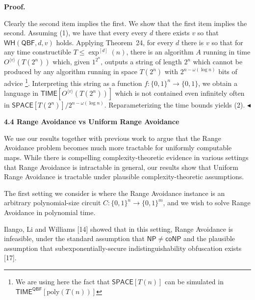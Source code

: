 


\par\medskip\noindent\textbf{Proof.}\par




Clearly the second item implies the first. We show that the first item implies the second. Assuming (1), we have that every every $d$ there exists $v$ so that $\mathsf{WH}(\mathsf{QBF},d,v)$ holds. Applying Theorem 24, for every $d$ there is $v$ so that for any time constructible $T\leq\exp^{[d]}(n)$, there is an algorithm $A$ running in time $O^{\langle v\rangle}(T(2^{n}))$ which, given $1^{2^{n}}$, outputs a string of length $2^{n}$ which cannot be produced by any algorithm running in space $T(2^{n})$ with $2^{n-\omega(\log n)}$ bits of advice \footnote{We are using here the fact that ${\mathsf{SPACE}}[T(n)]$ can be simulated in ${\mathsf{TIME}}^{\mathsf{QBF}}[\mathrm{poly}(T(n))]$}. Interpreting this string as a function $f:\{0,1\}^{n}\to\{0,1\}$, we obtain a language in ${\mathsf{TIME}}[O^{\langle v\rangle}(T(2^{n}))]$ which is not contained even infinitely often in ${\mathsf{SPACE}}[T(2^{n})]/2^{n-\omega(\log n)}$. Reparameterizing the time bounds yields (2).
$\blacktriangleleft$\par






\par\medskip\noindent\textbf{
4.4 Range Avoidance vs Uniform Range Avoidance}\par




We use our results together with previous work to argue that the Range Avoidance problem becomes much more tractable for uniformly computable maps. While there is compelling complexity-theoretic evidence in various settings that Range Avoidance is intractable in general, our results show that Uniform Range Avoidance is tractable under plausible complexity-theoretic assumptions.\par




The first setting we consider is where the Range Avoidance instance is an arbitrary polynomial-size circuit $C:\{0,1\}^{n}\to\{0,1\}^{m}$, and we wish to solve Range Avoidance in polynomial time.\par




Ilango, Li and Williams [14] showed that in this setting, Range Avoidance is infeasible, under the standard assumption that ${\mathsf{NP}}\neq{\mathsf{coNP}}$ and the plausible assumption that subexponentially-secure indistinguishability obfuscation exists [17].\par



